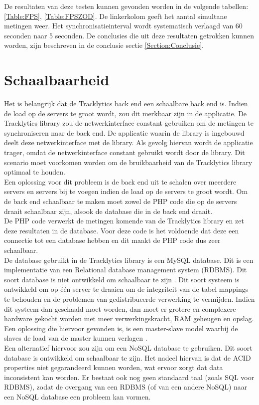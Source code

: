 De resultaten van deze testen kunnen gevonden worden in de volgende tabellen: \ref{Table:FPS}, \ref{Table:FPSZOD}. De linkerkolom geeft het aantal simultane metingen weer. Het synchronisatieinterval wordt systematisch verlaagd van 60 seconden naar 5 seconden. De conclusies die uit deze resultaten getrokken kunnen worden, zijn beschreven in de conclusie sectie \ref{Section:Conclusie}.




\section{Schaalbaarheid}
Het is belangrijk dat de Tracklytics back end een schaalbare back end is. Indien de load op de servers te groot wordt, zou dit merkbaar zijn in de applicatie. De Tracklytics library zou de netwerkinterface constant gebruiken om de metingen te synchroniseren naar de back end. De applicatie waarin de library is ingebouwd deelt deze netwerkinterface met de library. Als gevolg hiervan wordt de applicatie trager, omdat de netwerkinterface constant gebruikt wordt door de library. Dit scenario moet voorkomen worden om de bruikbaarheid van de Tracklytics library optimaal te houden.\\

Een oplossing voor dit probleem is de back end uit te schalen over meerdere servers en servers bij te voegen indien de load op de servers te groot wordt. Om de back end schaalbaar te maken moet zowel de PHP code die op de servers draait schaalbaar zijn, alsook de database die in de back end draait. \\

De PHP code verwerkt de metingen komende van de Tracklytics library en zet deze resultaten in de database. Voor deze code is het voldoende dat deze een connectie tot een database hebben en dit maakt de PHP code dus zeer schaalbaar.\\

De database gebruikt in de Tracklytics library is een MySQL database. Dit is een implementatie van een Relational database management system (RDBMS). Dit soort database is niet ontwikkeld om schaalbaar te zijn \cite{RDBMS}. Dit soort systeem is ontwikkeld om op \'e\'en server te draaien om de integriteit van de tabel mappings te behouden en de problemen van gedistribueerde verwerking te vermijden. Indien dit systeem dan geschaald moet worden, dan moet er grotere en complexere hardware gekocht worden met meer verwerkingskracht, RAM geheugen en opslag. Een oplossing die hiervoor gevonden is, is een master-slave model waarbij de slaves de load van de master kunnen verlagen \cite{MasterSlave}. \\
Een alternatief hiervoor zou zijn om een NoSQL database te gebruiken. Dit soort database is ontwikkeld om schaalbaar te zijn. Het nadeel hiervan is dat de ACID properties niet gegarandeerd kunnen worden, wat ervoor zorgt dat data inconsistent kan worden. Er bestaat ook nog geen standaard taal (zoals SQL voor RDBMS), zodat de overgang van een RDBMS (of van een andere NoSQL) naar een NoSQL database een probleem kan vormen. \\


